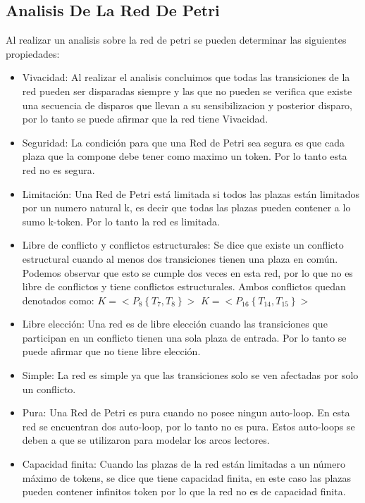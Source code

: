 \documentclass{article}
\begin{document}
	\subsection{Analisis De La Red De Petri}
	Al realizar un analisis sobre la red de petri se pueden determinar las siguientes propiedades:
	\begin{itemize}
		\item Vivacidad: Al realizar el analisis concluimos que todas las transiciones 
		de la red pueden ser disparadas siempre y las que no pueden se verifica que 
		existe una secuencia de disparos que llevan a su sensibilizacion y posterior 
		disparo, por lo tanto se puede afirmar que la red tiene Vivacidad.
		\item Seguridad: La condición para que una Red de Petri sea segura es que cada 
		plaza que la compone debe tener como maximo un token. Por lo tanto esta red no es segura.
		\item Limitación: Una Red de Petri está limitada si todos las plazas están limitados por 
		un numero natural k, es decir que todas las plazas pueden contener a lo sumo k-token. 
		Por lo tanto la red es limitada.
		\item Libre de conflicto y conflictos estructurales: Se dice que existe un conflicto 
		estructural cuando al menos dos transiciones tienen una plaza en común. Podemos 
		observar que esto se cumple dos veces en esta red, por lo que no es libre de conflictos 
		y tiene conflictos estructurales. Ambos conflictos quedan denotados como:
		$K = < P_{8}\left\lbrace T_{7},T_{8}\right\rbrace >$
		$K = < P_{16}\left\lbrace T_{14},T_{15}\right\rbrace >$
		\item Libre elección: Una red es de libre elección cuando las transiciones 
		que participan en un conflicto tienen una sola plaza de entrada. Por lo 
		tanto se puede afirmar que no tiene libre elección.
		\item Simple: La red es simple ya que las transiciones solo se ven afectadas 
		por solo un conflicto.
		\item Pura: Una Red de Petri es pura cuando no posee ningun auto-loop. En esta 
		red se encuentran dos auto-loop, por lo tanto no es pura. Estos auto-loops se 
		deben a que se utilizaron para modelar los arcos lectores.
		\item Capacidad finita: Cuando las plazas de la red están limitadas a un número 
		máximo de tokens, se dice que tiene capacidad finita, en este caso las plazas 
		pueden contener infinitos token por lo que la red no es de capacidad finita.

\end{itemize}
\end{document}
